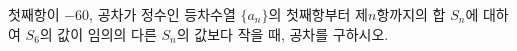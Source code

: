 첫째항이 $-60$, 공차가 정수인 등차수열 $\{a_n\}$의 첫째항부터 제$n$항까지의 합 $S_n$에 대하여 $S_6$의 값이 임의의 다른 $S_n$의 값보다 작을 때, 공차를 구하시오.
